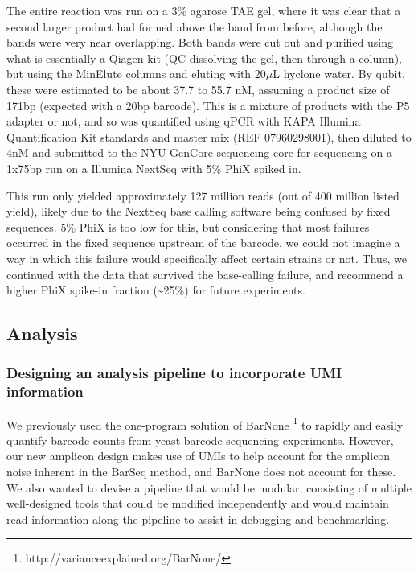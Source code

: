 {The entire reaction was run on a 3\% agarose TAE gel, where it was clear
that a second larger product had formed above the band from before,
although the bands were very near overlapping. Both bands were cut out
and purified using what is essentially a Qiagen kit (QC dissolving the
gel, then through a column), but using the MinElute columns and eluting
with 20\(\mu\)L hyclone water. By qubit, these were estimated to be
about 37.7 to 55.7 nM, assuming a product size of 171bp (expected with a
20bp barcode). This is a mixture of products with the P5 adapter or not,
and so was quantified using qPCR with KAPA Illumina Quantification Kit
standards and master mix (REF 07960298001), then diluted to 4nM and
submitted to the NYU GenCore sequencing core for sequencing on a 1x75bp
run on a Illumina NextSeq with 5\% PhiX spiked in.

This run only yielded approximately 127 million reads (out of 400
million listed yield), likely due to the NextSeq base calling software
being confused by fixed sequences. 5\% PhiX is too low for this, but
considering that most failures occurred in the fixed sequence upstream
of the barcode, we could not imagine a way in which this failure would
specifically affect certain strains or not. Thus, we continued with the
data that survived the base-calling failure, and recommend a higher PhiX
spike-in fraction (\textasciitilde{}25\%) for future experiments.

\subsection{Analysis}\label{analysis}

\subsubsection{Designing an analysis pipeline to incorporate UMI
information}\label{designing-an-analysis-pipeline-to-incorporate-umi-information}

We previously used the one-program solution of BarNone \footnote{http://varianceexplained.org/BarNone/}
to rapidly and easily quantify barcode counts from yeast barcode
sequencing experiments. However, our new amplicon design makes use of
UMIs to help account for the amplicon noise inherent in the BarSeq
method, and BarNone does not account for these. We also wanted to devise
a pipeline that would be modular, consisting of multiple well-designed
tools that could be modified independently and would maintain read
information along the pipeline to assist in debugging and benchmarking.

}
